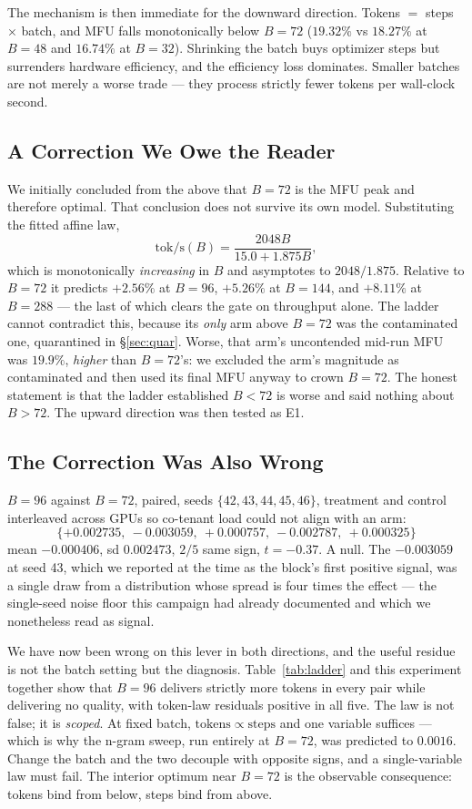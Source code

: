 \documentclass{article}
\begin{document}
The mechanism is then immediate for the downward direction. Tokens $=$ steps $\times$ batch, and MFU falls monotonically below $B{=}72$ ($19.32\%$ vs $18.27\%$ at $B{=}48$ and $16.74\%$ at $B{=}32$). Shrinking the batch buys optimizer steps but surrenders hardware efficiency, and the efficiency loss dominates. Smaller batches are not merely a worse trade --- they process strictly fewer tokens per wall-clock second.

\subsection{A Correction We Owe the Reader}
We initially concluded from the above that $B{=}72$ is the MFU peak and therefore optimal. That conclusion does not survive its own model. Substituting the fitted affine law,
\[
\mathrm{tok/s}(B) = \frac{2048B}{15.0 + 1.875B},
\]
which is monotonically \emph{increasing} in $B$ and asymptotes to $2048/1.875$. Relative to $B{=}72$ it predicts $+2.56\%$ at $B{=}96$, $+5.26\%$ at $B{=}144$, and $+8.11\%$ at $B{=}288$ --- the last of which clears the gate on throughput alone. The ladder cannot contradict this, because its \emph{only} arm above $B{=}72$ was the contaminated one, quarantined in \S\ref{sec:quar}. Worse, that arm's uncontended mid-run MFU was $19.9\%$, \emph{higher} than $B{=}72$'s: we excluded the arm's magnitude as contaminated and then used its final MFU anyway to crown $B{=}72$. The honest statement is that the ladder established $B<72$ is worse and said nothing about $B>72$. The upward direction was then tested as E1.

\subsection{The Correction Was Also Wrong}
\label{sec:recorrect}
$B{=}96$ against $B{=}72$, paired, seeds $\{42,43,44,45,46\}$, treatment and control interleaved across GPUs so co-tenant load could not align with an arm:
\[
\{+0.002735,\ -0.003059,\ +0.000757,\ -0.002787,\ +0.000325\}
\]
mean $-0.000406$, sd $0.002473$, $2/5$ same sign, $t = -0.37$. A null. The $-0.003059$ at seed 43, which we reported at the time as the block's first positive signal, was a single draw from a distribution whose spread is four times the effect --- the single-seed noise floor this campaign had already documented and which we nonetheless read as signal.

We have now been wrong on this lever in both directions, and the useful residue is not the batch setting but the diagnosis. Table~\ref{tab:ladder} and this experiment together show that $B{=}96$ delivers strictly more tokens in every pair while delivering no quality, with token-law residuals positive in all five. The law is not false; it is \emph{scoped}. At fixed batch, $\mathrm{tokens} \propto \mathrm{steps}$ and one variable suffices --- which is why the n-gram sweep, run entirely at $B{=}72$, was predicted to $0.0016$. Change the batch and the two decouple with opposite signs, and a single-variable law must fail. The interior optimum near $B{=}72$ is the observable consequence: tokens bind from below, steps bind from above.
\end{document}

